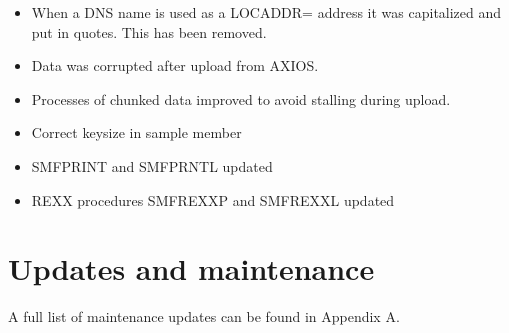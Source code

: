 \documentclass[letterpaper,10pt,english]{sphinxmanual}
\begin{document}
\begin{itemize}
\item {} 
When a DNS name is used as a LOCADDR= address it was capitalized and put in quotes. This has been removed.

\end{itemize}

\begin{itemize}
\item {} 
Data was corrupted after upload from AXIOS.

\end{itemize}

\begin{itemize}
\item {} 
Processes of chunked data improved to avoid stalling during upload.

\end{itemize}

\begin{itemize}
\item {} 
Correct keysize in sample member

\end{itemize}

\begin{itemize}
\item {} 
SMFPRINT and SMFPRNTL updated

\item {} 
REXX procedures SMFREXXP and SMFREXXL updated

\end{itemize}


\chapter{Updates and maintenance}
\label{\detokenize{TN202101:updates-and-maintenance}}
A full list of maintenance updates can be found in Appendix A.

\newpage
\end{document}
